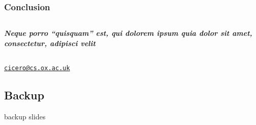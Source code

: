 \documentclass{beamer}
\begin{document}
\begin{frame}
  \frametitle{Conclusion}

  \vspace*{1cm}
  
  \begin{columns}
    \begin{column}{0.8\paperwidth}
      \textit{\textbf{\Large\color{oxlighterblue} 
          Neque porro ``quisquam'' est, qui dolorem ipsum quia \emph{dolor sit amet}, consectetur, adipisci velit}}

    \end{column}
  \end{columns}

    
  {          \centering

          \vspace*{15mm}
          
          \insertauthor
          
          \vspace*{3mm}
          
          \href{mailto:cicero@cs.ox.ac.uk}{\texttt{cicero@cs.ox.ac.uk}}
          
        }
        
\end{frame}



\appendix
\subsection{Backup}
\begin{frame}[noframenumbering]

  backup slides
\end{frame}
\end{document}
